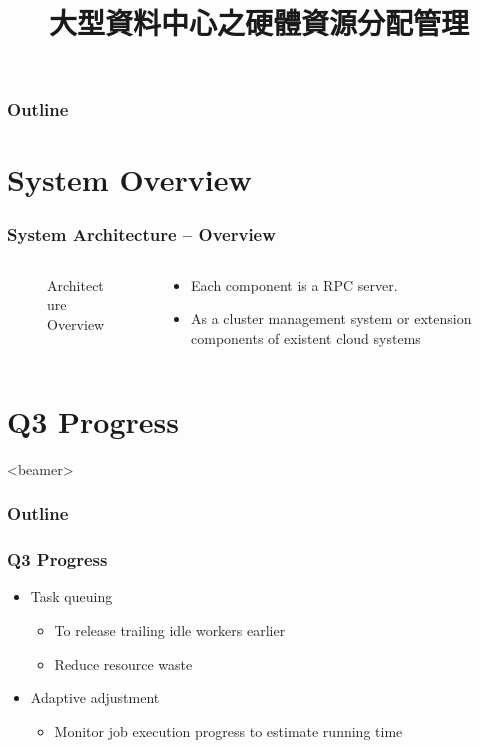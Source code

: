 \documentclass{beamer}
\title{大型資料中心之硬體資源分配管理}
\begin{document}
\begin{frame}
  \titlepage
  \label{title-page}
\end{frame}
\begin{frame}
  \frametitle{Outline}
  \tableofcontents[
    currentsubsection,
    sectionstyle=show/show,
    subsectionstyle=show/shaded,
  ]
\end{frame}


\section{System Overview}
\begin{frame}
  \frametitle{System Architecture -- Overview}
  \begin{columns}
    \begin{column}{.5\textwidth}
      \begin{figure}
        \resizebox{\linewidth}{!}{
          
        }
        \caption{Architecture Overview}
        \label{fig:archi-overview}
      \end{figure}
    \end{column}
    \begin{column}{.5\textwidth}
      \begin{itemize}
        \item Each component is a RPC server.
        \item As a cluster management system or extension
          components of existent cloud systems
      \end{itemize}
    \end{column}
  \end{columns}
\end{frame}



\section{Q3 Progress}
\begin{frame}<beamer>
  \frametitle{Outline}
  \tableofcontents[
    currentsubsection,
    sectionstyle=show/shaded,
    subsectionstyle=show/show/shaded,
  ]
\end{frame}

\begin{frame}
  \frametitle{Q3 Progress}
  \begin{itemize}
    \item Task queuing
      \begin{itemize}
        \item To release trailing idle workers earlier
        \item Reduce resource waste
      \end{itemize}
    \item Adaptive adjustment
      \begin{itemize}
        \item Monitor job execution progress to estimate running time
      \end{itemize}
  \end{itemize}
\end{frame}
\end{document}
